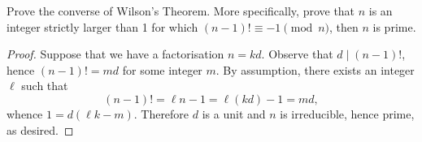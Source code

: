 \documentclass[10pt]{amsart}
\begin{document}
\begin{thm}\label{ex1}
  Prove the converse of Wilson's Theorem.
  More specifically, prove that $n$ is an integer strictly larger than 1 for which $(n-1)! \equiv -1 \pmod{n}$, then $n$ is prime.
  
  \begin{proof}
    Suppose that we have a factorisation $n = kd$.
    Observe that $d \mid (n-1)!$, hence $(n-1)! = md$ for some integer $m$.
    By assumption, there exists an integer $\ell$ such that
    $$(n-1)! = \ell n - 1 = \ell(kd) - 1 = md,$$
    whence $1 = d(\ell k - m)$.
    Therefore $d$ is a unit and $n$ is irreducible, hence prime, as desired.
  \end{proof}
\end{thm}
\end{document}

